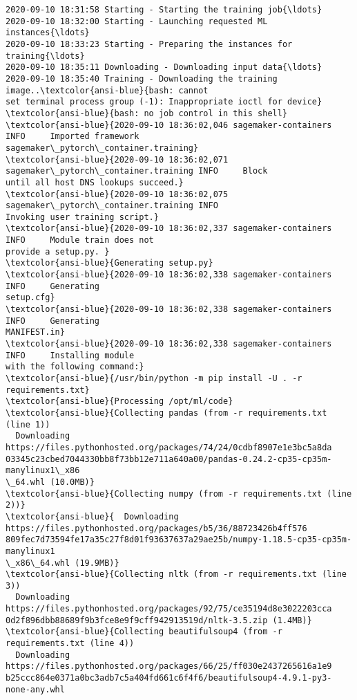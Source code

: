 \documentclass[11pt]{article}
\begin{document}
    \begin{Verbatim}[commandchars=\\\{\}]
2020-09-10 18:31:58 Starting - Starting the training job{\ldots}
2020-09-10 18:32:00 Starting - Launching requested ML instances{\ldots}
2020-09-10 18:33:23 Starting - Preparing the instances for training{\ldots}
2020-09-10 18:35:11 Downloading - Downloading input data{\ldots}
2020-09-10 18:35:40 Training - Downloading the training image..\textcolor{ansi-blue}{bash: cannot
set terminal process group (-1): Inappropriate ioctl for device}
\textcolor{ansi-blue}{bash: no job control in this shell}
\textcolor{ansi-blue}{2020-09-10 18:36:02,046 sagemaker-containers INFO     Imported framework
sagemaker\_pytorch\_container.training}
\textcolor{ansi-blue}{2020-09-10 18:36:02,071 sagemaker\_pytorch\_container.training INFO     Block
until all host DNS lookups succeed.}
\textcolor{ansi-blue}{2020-09-10 18:36:02,075 sagemaker\_pytorch\_container.training INFO
Invoking user training script.}
\textcolor{ansi-blue}{2020-09-10 18:36:02,337 sagemaker-containers INFO     Module train does not
provide a setup.py. }
\textcolor{ansi-blue}{Generating setup.py}
\textcolor{ansi-blue}{2020-09-10 18:36:02,338 sagemaker-containers INFO     Generating
setup.cfg}
\textcolor{ansi-blue}{2020-09-10 18:36:02,338 sagemaker-containers INFO     Generating
MANIFEST.in}
\textcolor{ansi-blue}{2020-09-10 18:36:02,338 sagemaker-containers INFO     Installing module
with the following command:}
\textcolor{ansi-blue}{/usr/bin/python -m pip install -U . -r requirements.txt}
\textcolor{ansi-blue}{Processing /opt/ml/code}
\textcolor{ansi-blue}{Collecting pandas (from -r requirements.txt (line 1))
  Downloading https://files.pythonhosted.org/packages/74/24/0cdbf8907e1e3bc5a8da
03345c23cbed7044330bb8f73bb12e711a640a00/pandas-0.24.2-cp35-cp35m-manylinux1\_x86
\_64.whl (10.0MB)}
\textcolor{ansi-blue}{Collecting numpy (from -r requirements.txt (line 2))}
\textcolor{ansi-blue}{  Downloading https://files.pythonhosted.org/packages/b5/36/88723426b4ff576
809fec7d73594fe17a35c27f8d01f93637637a29ae25b/numpy-1.18.5-cp35-cp35m-manylinux1
\_x86\_64.whl (19.9MB)}
\textcolor{ansi-blue}{Collecting nltk (from -r requirements.txt (line 3))
  Downloading https://files.pythonhosted.org/packages/92/75/ce35194d8e3022203cca
0d2f896dbb88689f9b3fce8e9f9cff942913519d/nltk-3.5.zip (1.4MB)}
\textcolor{ansi-blue}{Collecting beautifulsoup4 (from -r requirements.txt (line 4))
  Downloading https://files.pythonhosted.org/packages/66/25/ff030e2437265616a1e9
b25ccc864e0371a0bc3adb7c5a404fd661c6f4f6/beautifulsoup4-4.9.1-py3-none-any.whl

\end{Verbatim}
\end{document}
